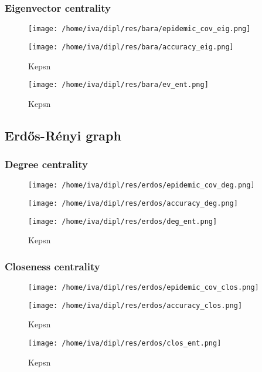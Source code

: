\documentclass[times, utf8, diplomski]{fer}
\begin{document}
\subsubsection{Eigenvector centrality}
\begin{figure}[H]
\texttt{[image: /home/iva/dipl/res/bara/epidemic\_cov\_eig.png]}
\end{figure}
\begin{figure}[H]
\texttt{[image: /home/iva/dipl/res/bara/accuracy\_eig.png]}
\caption{Kepsn}
\end{figure}
\begin{figure}[H]
\texttt{[image: /home/iva/dipl/res/bara/ev\_ent.png]}
\caption{Kepsn}
\end{figure}

\subsection{Erd{\H{o}}s-R{\'{e}}nyi graph}
\subsubsection{Degree centrality}
\begin{figure}[H]
\texttt{[image: /home/iva/dipl/res/erdos/epidemic\_cov\_deg.png]}
\end{figure}
\begin{figure}[H]
\texttt{[image: /home/iva/dipl/res/erdos/accuracy\_deg.png]}
\end{figure}
\begin{figure}[H]
\texttt{[image: /home/iva/dipl/res/erdos/deg\_ent.png]}
\caption{Kepsn}
\end{figure}

\subsubsection{Closeness centrality}
\begin{figure}[H]
\texttt{[image: /home/iva/dipl/res/erdos/epidemic\_cov\_clos.png]}
\end{figure}
\begin{figure}[H]
\texttt{[image: /home/iva/dipl/res/erdos/accuracy\_clos.png]}
\caption{Kepsn}
\end{figure}
\begin{figure}[H]
\texttt{[image: /home/iva/dipl/res/erdos/clos\_ent.png]}
\caption{Kepsn}
\end{figure}
\end{document}
